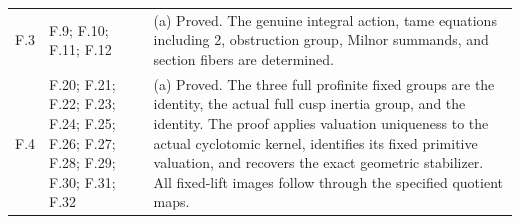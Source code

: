 \begin{longtable}{@{}p{1.1cm}p{3.0cm}p{10.3cm}@{}}
F.3 & F.9; F.10; F.11; F.12 & (a) Proved. The genuine integral action, tame equations including 2, obstruction group, Milnor summands, and section fibers are determined. \\
F.4 & F.20; F.21; F.22; F.23; F.24; F.25; F.26; F.27; F.28; F.29; F.30; F.31; F.32 & (a) Proved. The three full profinite fixed groups are the identity, the actual full cusp inertia group, and the identity. The proof applies valuation uniqueness to the actual cyclotomic kernel, identifies its fixed primitive valuation, and recovers the exact geometric stabilizer. All fixed-lift images follow through the specified quotient maps. \\
\bottomrule\end{longtable}
